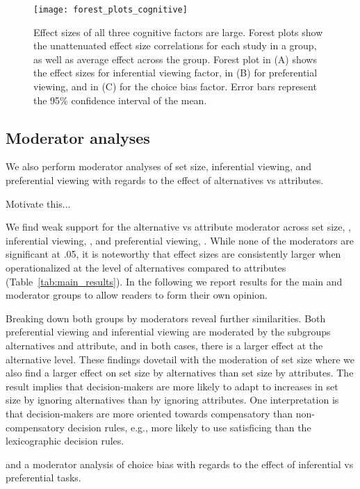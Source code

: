 \documentclass{article}
\begin{document}
\begin{figure}%
\texttt{[image: forest\_plots\_cognitive]}
\centering
\caption{Effect sizes of all three cognitive factors are large. Forest plots show the unattenuated effect size correlations for each study in a group, as well as average effect across the group. Forest plot in (A) shows the effect sizes for inferential viewing factor, in (B) for preferential viewing, and in (C) for the choice bias factor. Error bars represent the 95\% confidence interval of the mean.}
\label{fig:forest_plots_cognitive}
\end{figure}


\subsection{Moderator analyses}

We also perform moderator analyses of set size, inferential viewing, and preferential viewing with regards to the effect of alternatives vs attributes.

Motivate this...

We find weak support for the alternative vs attribute moderator across set size, , inferential viewing, , and preferential viewing, . While none of the moderators are significant at .05, it is noteworthy that effect sizes are consistently larger when operationalized at the level of alternatives compared to attributes (Table~\ref{tab:main_results}). In the following we report results for the main and moderator groups to allow readers to form their own opinion. 

Breaking down both groups by moderators reveal further similarities. Both preferential viewing and inferential viewing are moderated by the subgroups alternatives and attribute, and in both cases, there is a larger effect at the alternative level. These findings dovetail with the moderation of set size where we also find a larger effect on set size by alternatives than set size by attributes. The result implies that decision-makers are more likely to adapt to increases in set size by ignoring alternatives than by ignoring attributes. One interpretation is that decision-makers are more oriented towards compensatory than non-compensatory decision rules, e.g., more likely to use satisficing than the lexicographic decision rules. 


and a moderator analysis of choice bias with regards to the effect of inferential vs preferential tasks.
\end{document}
